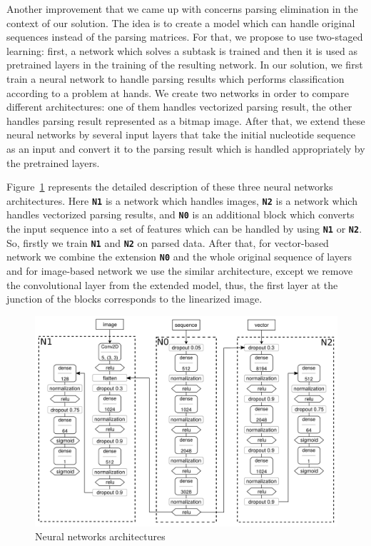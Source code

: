 \documentclass[runningheads]{llncs}
\begin{document}
Another improvement that we came up with concerns parsing elimination in the context of our solution. The idea is to create a model which can handle original sequences instead of the parsing matrices. For that, we propose to use two-staged learning: first, a network which solves a subtask is trained and then it is used as pretrained layers in the training of the resulting network.
In our solution, we first train a neural network to handle parsing results which performs classification according to a problem at hands. We create two networks in order to compare different architectures: one of them handles vectorized parsing result, the other handles parsing result represented as a bitmap image. After that, we extend these neural networks by several input layers that take the initial nucleotide sequence as an input and convert it to the parsing result which is handled appropriately by the pretrained layers.

Figure~\ref{nn} represents the detailed description of these three neural networks architectures.
Here \textbf{\texttt{N1}} is a network which handles images, \textbf{\texttt{N2}} is a network which handles vectorized parsing results, and \textbf{\texttt{N0}} is an additional block which converts the input sequence into a set of features which can be handled by using \textbf{\texttt{N1}} or \textbf{\texttt{N2}}. So, firstly we train \textbf{\texttt{N1}} and \textbf{\texttt{N2}} on parsed data. After that, for vector-based network we combine the extension \textbf{\texttt{N0}} and the whole original sequence of layers and for image-based network we use the similar architecture, except we remove the convolutional layer from the extended model, thus, the first layer at the junction of the blocks corresponds to the linearized image.

\begin{figure}[h]
\begin{center}
\centering
\includegraphics[width=12cm]{figures/nn_arch.pdf}
\caption{Neural networks architectures}
\label{nn}
\end{center}
\end{figure}
\end{document}
